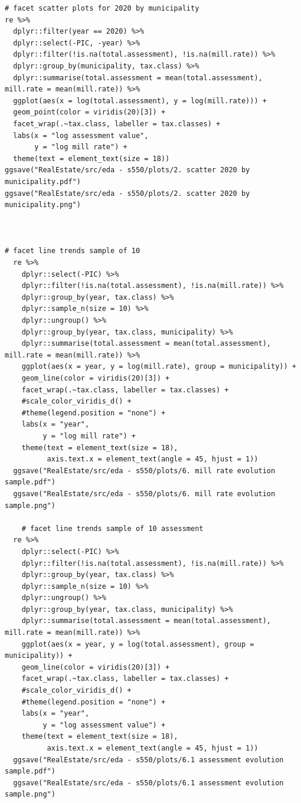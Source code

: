 \documentclass{article}
\begin{document}
\begin{lstlisting}[style=R, caption={Code used for the exploratory data analysis.}, captionpos=b]
# facet scatter plots for 2020 by municipality
re %>% 
  dplyr::filter(year == 2020) %>% 
  dplyr::select(-PIC, -year) %>% 
  dplyr::filter(!is.na(total.assessment), !is.na(mill.rate)) %>% 
  dplyr::group_by(municipality, tax.class) %>% 
  dplyr::summarise(total.assessment = mean(total.assessment), mill.rate = mean(mill.rate)) %>% 
  ggplot(aes(x = log(total.assessment), y = log(mill.rate))) +
  geom_point(color = viridis(20)[3]) +
  facet_wrap(.~tax.class, labeller = tax.classes) +
  labs(x = "log assessment value",
       y = "log mill rate") +
  theme(text = element_text(size = 18))
ggsave("RealEstate/src/eda - s550/plots/2. scatter 2020 by municipality.pdf")
ggsave("RealEstate/src/eda - s550/plots/2. scatter 2020 by municipality.png")



# facet line trends sample of 10
  re %>% 
    dplyr::select(-PIC) %>% 
    dplyr::filter(!is.na(total.assessment), !is.na(mill.rate)) %>% 
    dplyr::group_by(year, tax.class) %>% 
    dplyr::sample_n(size = 10) %>% 
    dplyr::ungroup() %>% 
    dplyr::group_by(year, tax.class, municipality) %>% 
    dplyr::summarise(total.assessment = mean(total.assessment), mill.rate = mean(mill.rate)) %>% 
    ggplot(aes(x = year, y = log(mill.rate), group = municipality)) +
    geom_line(color = viridis(20)[3]) +
    facet_wrap(.~tax.class, labeller = tax.classes) + 
    #scale_color_viridis_d() +
    #theme(legend.position = "none") +
    labs(x = "year",
         y = "log mill rate") +
    theme(text = element_text(size = 18),
          axis.text.x = element_text(angle = 45, hjust = 1))
  ggsave("RealEstate/src/eda - s550/plots/6. mill rate evolution sample.pdf")
  ggsave("RealEstate/src/eda - s550/plots/6. mill rate evolution sample.png")
  
    # facet line trends sample of 10 assessment
  re %>% 
    dplyr::select(-PIC) %>% 
    dplyr::filter(!is.na(total.assessment), !is.na(mill.rate)) %>% 
    dplyr::group_by(year, tax.class) %>% 
    dplyr::sample_n(size = 10) %>% 
    dplyr::ungroup() %>% 
    dplyr::group_by(year, tax.class, municipality) %>% 
    dplyr::summarise(total.assessment = mean(total.assessment), mill.rate = mean(mill.rate)) %>% 
    ggplot(aes(x = year, y = log(total.assessment), group = municipality)) +
    geom_line(color = viridis(20)[3]) +
    facet_wrap(.~tax.class, labeller = tax.classes) + 
    #scale_color_viridis_d() +
    #theme(legend.position = "none") +
    labs(x = "year",
         y = "log assessment value") +
    theme(text = element_text(size = 18),
          axis.text.x = element_text(angle = 45, hjust = 1))
  ggsave("RealEstate/src/eda - s550/plots/6.1 assessment evolution sample.pdf")
  ggsave("RealEstate/src/eda - s550/plots/6.1 assessment evolution sample.png")
  

\end{lstlisting}
\end{document}
